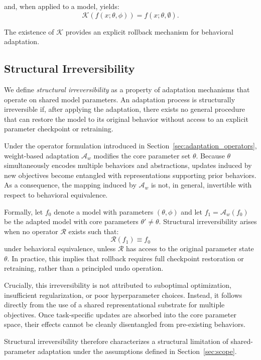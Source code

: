 \documentclass{article}
\begin{document}
	and, when applied to a model, yields:
	\[
	\mathcal{K}(f(x;\theta,\phi)) = f(x;\theta,\emptyset).
	\]
	
	The existence of $\mathcal{K}$ provides an explicit rollback mechanism for behavioral adaptation.
	
	\subsection{Structural Irreversibility}
	\label{sec:irreversibility}
	
	We define \emph{structural irreversibility} as a property of adaptation mechanisms that operate on shared model parameters. An adaptation process is structurally irreversible if, after applying the adaptation, there exists no general procedure that can restore the model to its original behavior without access to an explicit parameter checkpoint or retraining.
	
	Under the operator formulation introduced in Section~\ref{sec:adaptation_operators}, weight-based adaptation $\mathcal{A}_w$ modifies the core parameter set $\theta$. Because $\theta$ simultaneously encodes multiple behaviors and abstractions, updates induced by new objectives become entangled with representations supporting prior behaviors. As a consequence, the mapping induced by $\mathcal{A}_w$ is not, in general, invertible with respect to behavioral equivalence.
	
	Formally, let $f_0$ denote a model with parameters $(\theta,\phi)$ and let $f_1 = \mathcal{A}_w(f_0)$ be the adapted model with core parameters $\theta' \neq \theta$. Structural irreversibility arises when no operator $\mathcal{R}$ exists such that:
	\[
	\mathcal{R}(f_1) \equiv f_0
	\]
	under behavioral equivalence, unless $\mathcal{R}$ has access to the original parameter state $\theta$. In practice, this implies that rollback requires full checkpoint restoration or retraining, rather than a principled undo operation.
	
	Crucially, this irreversibility is not attributed to suboptimal optimization, insufficient regularization, or poor hyperparameter choices. Instead, it follows directly from the use of a shared representational substrate for multiple objectives. Once task-specific updates are absorbed into the core parameter space, their effects cannot be cleanly disentangled from pre-existing behaviors.
	
	Structural irreversibility therefore characterizes a structural limitation of shared-parameter adaptation under the assumptions defined in Section~\ref{sec:scope}.
	
\end{document}
